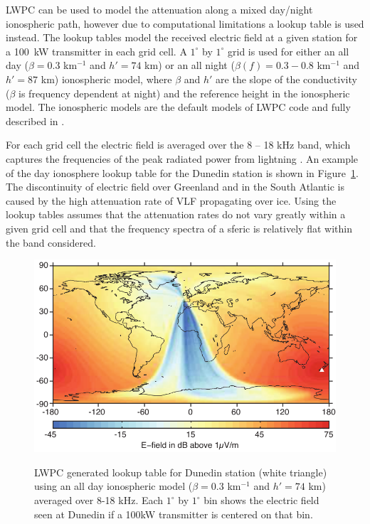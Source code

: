 LWPC can be used to model the attenuation along a mixed day/night ionospheric path, however due to computational limitations a lookup table is used instead.
The lookup tables model the received electric field at a given station for a 100~kW transmitter in each grid cell.
A $1^{\circ}$ by $1^{\circ}$ grid is used for either an all day ($\beta=0.3$ km$^{-1}$ and $h'=74$ km) or an all night ($\beta(f)=0.3-0.8$ km$^{-1}$ and $h'=87$ km) ionospheric model, where $\beta$ and $h'$ are the slope of the conductivity ($\beta$ is frequency dependent at night) and the reference height in the ionospheric model.
The ionospheric models are the default models of LWPC code and fully described in \citet{Ferguson1998}. 

For each grid cell the electric field is averaged over the 8 -- 18 kHz band, which captures the frequencies of the peak radiated power from lightning \citep{Volland1995}.
An example of the day ionosphere lookup table for the Dunedin station is shown in Figure~\ref{intro:fig:lookup}.
The discontinuity of electric field over Greenland and in the South Atlantic is caused by the high attenuation rate of VLF propagating over ice.
Using the lookup tables assumes that the attenuation rates do not vary greatly within a given grid cell and that the frequency spectra of a sferic is relatively flat within the band considered.

\begin{figure}[ht!]
	\centering
	\includegraphics[scale=1]{Introduction/Figures/lwpc_Lookup.pdf}\\
	\caption{LWPC generated lookup table for Dunedin station (white triangle) using an all day ionospheric model ($	\beta=0.3$ km$^{-1}$ and $h'=74$ km) averaged over 8-18 kHz. Each $1^{\circ}$ by $1^{\circ}$ bin shows the electric field seen at Dunedin if a 100kW transmitter is centered on that bin.}
	\label{intro:fig:lookup}
\end{figure}

